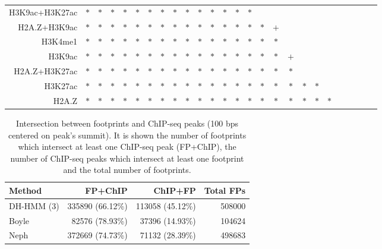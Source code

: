 \documentclass{bioinfo}
\begin{document}
\begin{table}[t]
\begin{center}
\begin{tabular}{ rccccccccccccccccccccccccc }
    H3K9ac+H3K27ac & $*$ & $*$ & $*$ & $*$ & $*$ & $*$ & $*$ & $*$ & $*$ & $*$ & $*$ & $*$ & $*$ & $*$ &     &     &     &     &     &     &     &     &     &     &     \\
    H2A.Z+H3K9ac & $*$ & $*$ & $*$ & $*$ & $*$ & $*$ & $*$ & $*$ & $*$ & $*$ & $*$ & $*$ & $*$ & $*$ & $*$ & $+$ &     &     &     &     &     &     &     &     &     \\
    H3K4me1 & $*$ & $*$ & $*$ & $*$ & $*$ & $*$ & $*$ & $*$ & $*$ & $*$ & $*$ & $*$ & $*$ & $*$ & $*$ & $*$ &     &     &     &     &     &     &     &     &     \\
    H3K9ac & $*$ & $*$ & $*$ & $*$ & $*$ & $*$ & $*$ & $*$ & $*$ & $*$ & $*$ & $*$ & $*$ & $*$ & $*$ & $*$ & $+$ &     &     &     &     &     &     &     &     \\
    H2A.Z+H3K27ac & $*$ & $*$ & $*$ & $*$ & $*$ & $*$ & $*$ & $*$ & $*$ & $*$ & $*$ & $*$ & $*$ & $*$ & $*$ & $*$ & $*$ &     &     &     &     &     &     &     &     \\
    H3K27ac & $*$ & $*$ & $*$ & $*$ & $*$ & $*$ & $*$ & $*$ & $*$ & $*$ & $*$ & $*$ & $*$ & $*$ & $*$ & $*$ & $*$ & $*$ & $*$ &     &     &     &     &     &     \\
    H2A.Z & $*$ & $*$ & $*$ & $*$ & $*$ & $*$ & $*$ & $*$ & $*$ & $*$ & $*$ & $*$ & $*$ & $*$ & $*$ & $*$ & $*$ & $*$ & $*$ & $*$ &     &     &     &     &     \\
    \hline
  \end{tabular}
\end{center}
\vspace{0.0cm}
\end{table}

\begin{table}[t]
\begin{center}
\caption{{\color{black} Intersection between footprints and ChIP-seq peaks (100 bps centered on peak's summit). It is shown the number of footprints which intersect at least one ChIP-seq peak (FP+ChIP), the number of ChIP-seq peaks which intersect at least one footprint and the total number of footprints.}}
\label{tab:footchip}
\renewcommand{\arraystretch}{1.2}
  \begin{tabular}{ lrrr }
    \hline
    \textbf{Method} & \textbf{FP+ChIP} & \textbf{ChIP+FP} & \textbf{Total FPs} \\
    \hline
    DH-HMM (3)      & 335890 (66.12\%) & 113058 (45.12\%) & 508000 \\
    \hline
    Boyle           & 82576 (78.93\%)  & 37396 (14.93\%) & 104624 \\
    \hline
    Neph            & 372669 (74.73\%) & 71132 (28.39\%) & 498683 \\
    \hline
  \end{tabular}
\end{center}
\end{table}
\end{document}
